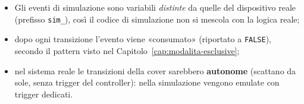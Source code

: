 \begin{intuition}
\begin{itemize}
    \item Gli eventi di simulazione sono variabili \emph{distinte} da quelle del dispositivo reale (prefisso \texttt{sim\_}), così il codice di simulazione non si mescola con la logica reale;
    \item dopo ogni transizione l'evento viene «consumato» (riportato a \texttt{FALSE}), secondo il pattern visto nel Capitolo~\ref{cap:modalita-esclusive};
    \item nel sistema reale le transizioni della cover sarebbero \textbf{autonome} (scattano da sole, senza trigger del controller): nella simulazione vengono emulate con trigger dedicati.
\end{itemize}
\end{intuition}
